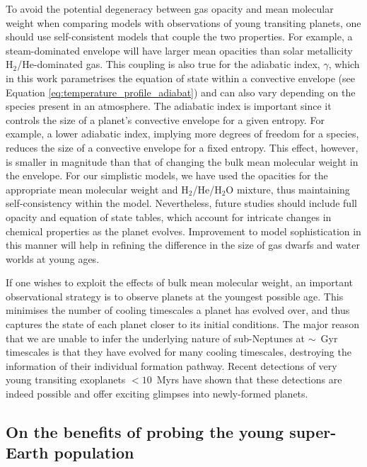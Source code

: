 \documentclass[fleqn,usenatbib]{mnras}
\begin{document}
To avoid the potential degeneracy between gas opacity and mean molecular weight when comparing models with observations of young transiting planets, one should use self-consistent models that couple the two properties. For example, a steam-dominated envelope will have larger mean opacities than solar metallicity H$_2$/He-dominated gas. This coupling is also true for the adiabatic index, $\gamma$, which in this work parametrises the equation of state within a convective envelope (see Equation \ref{eq:temperature_profile_adiabat}) and can also vary depending on the species present in an atmosphere. The adiabatic index is important since it controls the size of a planet's convective envelope for a given entropy. For example, a lower adiabatic index, implying more degrees of freedom for a species, reduces the size of a convective envelope for a fixed entropy. This effect, however, is smaller in magnitude than that of changing the bulk mean molecular weight in the envelope. For our simplistic models, we have used the opacities for the appropriate mean molecular weight and H$_2$/He/H$_2$O mixture, thus maintaining self-consistency within the model. Nevertheless, future studies should include full opacity and equation of state tables, which account for intricate changes in chemical properties as the planet evolves. Improvement to model sophistication in this manner will help in refining the difference in the size of gas dwarfs and water worlds at young ages. 

If one wishes to exploit the effects of bulk mean molecular weight, an important observational strategy is to observe planets at the youngest possible age. This minimises the number of cooling timescales a planet has evolved over, and thus captures the state of each planet closer to its initial conditions. The major reason that we are unable to infer the underlying nature of sub-Neptunes at $\sim$~Gyr timescales is that they have evolved for many cooling timescales, destroying the information of their individual formation pathway. Recent detections of very young transiting exoplanets $<10$~Myrs \citep[e.g.][]{Barber2024} have shown that these detections are indeed possible and offer exciting glimpses into newly-formed planets.

\subsection{On the benefits of probing the young super-Earth population} \label{sec:super-Earths}
\end{document}
